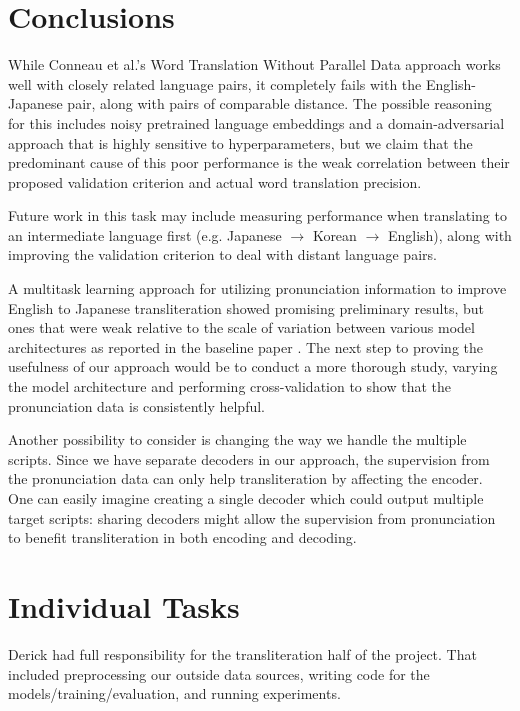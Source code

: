 \documentclass{article}
\begin{document}
\section*{Conclusions}

While Conneau et al.'s Word Translation Without Parallel Data approach
works well with closely related language pairs, it completely fails
with the English-Japanese pair, along with pairs of comparable distance.
The possible reasoning for this includes noisy pretrained language
embeddings and a domain-adversarial approach that is highly sensitive
to hyperparameters, but we claim that the predominant cause of this
poor performance is the weak correlation between their proposed
validation criterion and actual word translation precision.

Future work in this task may include measuring performance when translating
to an intermediate language first (e.g. Japanese $\rightarrow$ Korean
$\rightarrow$ English), along with improving the validation criterion to
deal with distant language pairs.

A multitask learning approach for utilizing pronunciation information
to improve English to Japanese transliteration
showed promising preliminary results,
but ones that were weak relative to the scale of variation
between various model architectures as reported
in the baseline paper \cite{Rosca2016SequencetosequenceNN}.
The next step to proving the usefulness of our approach
would be to conduct a more thorough study,
varying the model architecture and performing cross-validation
to show that the pronunciation data is consistently helpful.

Another possibility to consider
is changing the way we handle the multiple scripts.
Since we have separate decoders in our approach,
the supervision from the pronunciation data
can only help transliteration by affecting the encoder.
One can easily imagine creating a single decoder
which could output multiple target scripts:
sharing decoders might allow the supervision from pronunciation
to benefit transliteration in both encoding and decoding.

\section*{Individual Tasks}

Derick had full responsibility for the transliteration half of the project.
That included preprocessing our outside data sources,
writing code for the models/training/evaluation,
and running experiments.
\end{document}
